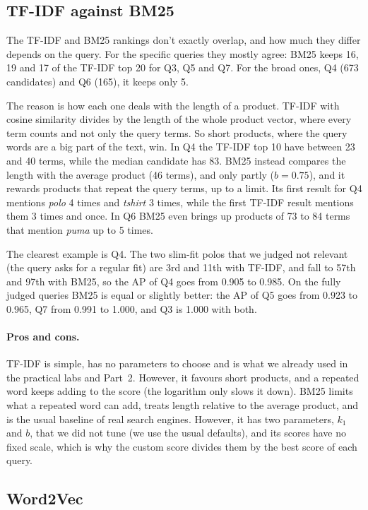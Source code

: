 \documentclass[11pt,a4paper]{article}
\begin{document}
\subsection{TF-IDF against BM25}

The TF-IDF and BM25 rankings don't exactly overlap, and how much they differ depends on the query. For the specific queries they mostly agree: BM25 keeps 16, 19 and 17 of the TF-IDF top 20 for Q3, Q5 and Q7. For the broad ones, Q4 (673 candidates) and Q6 (165), it keeps only 5.

The reason is how each one deals with the length of a product. TF-IDF with cosine similarity divides by the length of the whole product vector, where every term counts and not only the query terms. So short products, where the query words are a big part of the text, win. In Q4 the TF-IDF top 10 have between 23 and 40 terms, while the median candidate has 83. BM25 instead compares the length with the average product (46 terms), and only partly ($b = 0.75$), and it rewards products that repeat the query terms, up to a limit. Its first result for Q4 mentions \emph{polo} 4 times and \emph{tshirt} 3 times, while the first TF-IDF result mentions them 3 times and once. In Q6 BM25 even brings up products of 73 to 84 terms that mention \emph{puma} up to 5 times.

The clearest example is Q4. The two slim-fit polos that we judged not relevant (the query asks for a regular fit) are 3rd and 11th with TF-IDF, and fall to 57th and 97th with BM25, so the AP of Q4 goes from 0.905 to 0.985. On the fully judged queries BM25 is equal or slightly better: the AP of Q5 goes from 0.923 to 0.965, Q7 from 0.991 to 1.000, and Q3 is 1.000 with both.

\paragraph{Pros and cons.} TF-IDF is simple, has no parameters to choose and is what we already used in the practical labs and Part~2. However, it favours short products, and a repeated word keeps adding to the score (the logarithm only slows it down). BM25 limits what a repeated word can add, treats length relative to the average product, and is the usual baseline of real search engines. However, it has two parameters, $k_1$ and $b$, that we did not tune (we use the usual defaults), and its scores have no fixed scale, which is why the custom score divides them by the best score of each query.

\subsection{Word2Vec}
\end{document}
